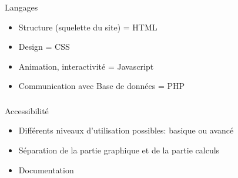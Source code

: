 \documentclass[11pt]{beamer}
\begin{document}
\begin{frame}
	\frametitle{\secname}
	\begin{block}{Langages}
		\begin{itemize}
		\item Structure (squelette du site) = HTML
\item Design = CSS
\item Animation, interactivité = Javascript
\item Communication avec Base de données = PHP

		\end{itemize}
	\end{block}
\end{frame}

\begin{frame}
	\frametitle{\secname}
	\begin{block}{Accessibilité}
	\begin{itemize}
	\item Différents niveaux d'utilisation possibles: basique ou avancé
	\item Séparation de la partie graphique et de la partie calculs
	\item Documentation
	\end{itemize}
	\end{block}
\end{frame}
\end{document}
